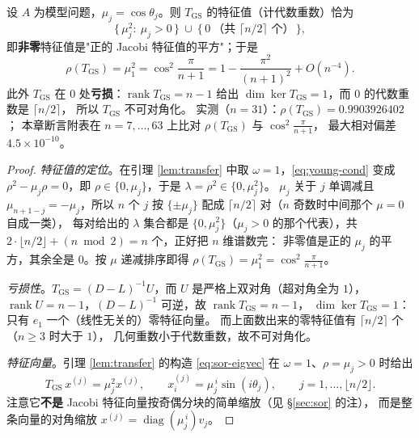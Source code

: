 \begin{theorem}
\label{thm:gs-spectrum}
设 $A$ 为模型问题，$\mu_j=\cos\theta_j$。则 $T_{\mathrm{GS}}$ 的特征值（计代数重数）恰为
\begin{equation}
  \bigl\{\,\mu_j^2:\ \mu_j>0\,\bigr\}\ \cup\ \bigl\{\,0\ \text{（共 }\lceil n/2\rceil\text{ 个）}\,\bigr\},
  \label{eq:gs-spectrum}
\end{equation}
即\textbf{非零}特征值是"正的 Jacobi 特征值的平方"；于是
\begin{equation}
  \rho(T_{\mathrm{GS}})=\mu_1^2=\cos^2\frac{\pi}{n+1}=1-\frac{\pi^2}{(n+1)^2}+O(n^{-4}).
  \label{eq:gs-rho}
\end{equation}
此外 $T_{\mathrm{GS}}$ 在 $0$ 处\textbf{亏损}：$\operatorname{rank}T_{\mathrm{GS}}=n-1$ 给出
$\dim\ker T_{\mathrm{GS}}=1$，而 $0$ 的代数重数是 $\lceil n/2\rceil$，
所以 $T_{\mathrm{GS}}$ 不可对角化。
实测（$n=31$）：$\rho(T_{\mathrm{GS}})=0.9903926402$；
本章断言附表在 $n=7,\dots,63$ 上比对 $\rho(T_{\mathrm{GS}})$ 与 $\cos^2\frac{\pi}{n+1}$，
最大相对偏差 $4.5\times10^{-10}$。
\end{theorem}

\begin{proof}
\emph{特征值的定位}。在引理 \ref{lem:transfer} 中取 $\omega=1$，\eqref{eq:young-cond} 变成
$\rho^2-\mu_j\rho=0$，即 $\rho\in\{0,\mu_j\}$，于是 $\lambda=\rho^2\in\{0,\mu_j^2\}$。
$\mu_j$ 关于 $j$ 单调减且 $\mu_{n+1-j}=-\mu_j$，所以 $n$ 个 $j$ 按 $\{\pm\mu_j\}$ 配成
$\lceil n/2\rceil$ 对（$n$ 奇数时中间那个 $\mu=0$ 自成一类），
每对给出的 $\lambda$ 集合都是 $\{0,\mu_j^2\}$（$\mu_j>0$ 的那个代表），共
$2\cdot\lfloor n/2\rfloor+(n\bmod 2)=n$ 个，正好把 $n$ 维谱数完：
非零值是正的 $\mu_j$ 的平方，其余全是 $0$。按 $\mu$ 递减排序即得
$\rho(T_{\mathrm{GS}})=\mu_1^2=\cos^2\frac{\pi}{n+1}$。

\emph{亏损性}。$T_{\mathrm{GS}}=(D-L)^{-1}U$，而 $U$ 是严格上双对角（超对角全为 $1$），
$\operatorname{rank}U=n-1$，$(D-L)^{-1}$ 可逆，故 $\operatorname{rank}T_{\mathrm{GS}}=n-1$，
$\dim\ker T_{\mathrm{GS}}=1$：只有 $e_1$ 一个（线性无关的）零特征向量。
而上面数出来的零特征值有 $\lceil n/2\rceil$ 个（$n\ge3$ 时大于 $1$），
几何重数小于代数重数，故不可对角化。

\emph{特征向量}。引理 \ref{lem:transfer} 的构造 \eqref{eq:sor-eigvec} 在 $\omega=1$、$\rho=\mu_j>0$ 时给出
\begin{equation}
  T_{\mathrm{GS}}\,x^{(j)}=\mu_j^2x^{(j)},\qquad
  x^{(j)}_i=\mu_j^{\,i}\sin(i\theta_j),\qquad j=1,\dots,\lfloor n/2\rfloor .
  \label{eq:gs-eigvec}
\end{equation}
注意它\textbf{不是} Jacobi 特征向量按奇偶分块的简单缩放（见 \S\ref{sec:sor} 的注），
而是整条向量的对角缩放 $x^{(j)}=\operatorname{diag}(\mu_j^{\,i})v_j$。
\end{proof}

